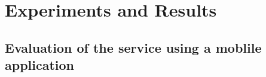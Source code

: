 
\chapter{Experiments and Results}
\section{Evaluation of the service using a moblile application}
\cleardoublepage
